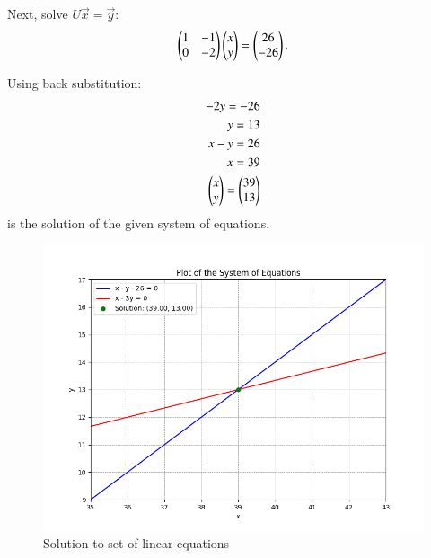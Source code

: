 \documentclass[journal]{IEEEtran}
\begin{document}
Next, solve $U\vec{x} = \vec{y}$:
\begin{align}
    \begin{pmatrix}1 & -1 \\ 0 & -2\end{pmatrix} \begin{pmatrix}x \\ y\end{pmatrix} = \begin{pmatrix}26 \\ -26\end{pmatrix}.
\end{align}

Using back substitution:
\begin{align}
	-2y=-26\\
    y=13\\
    x-y=26\\
    x=39\\
    \begin{pmatrix}x \\ y\end{pmatrix}= \begin{pmatrix}39 \\ 13\end{pmatrix}
\end{align}
is the solution of the given system of equations.
\begin{figure}[h!]
   \centering
   \includegraphics[width=1\columnwidth]{figs/fig.png}
    \caption{Solution to set of linear equations}
\end{figure}
\end{document}

